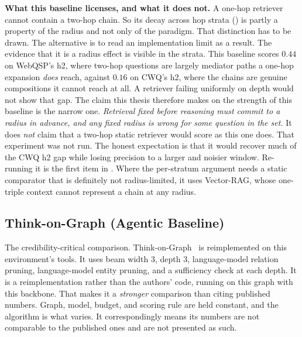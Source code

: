\textbf{What this baseline licenses, and what it does not.} A one-hop retriever
cannot contain a two-hop chain. So its decay across hop strata
() is partly a property of the radius and not only of the
paradigm. That distinction has to be drawn. The alternative is to read an
implementation limit as a result. The evidence that it is a radius effect is
visible in the strata. This baseline scores $0.44$ on WebQSP's \textsf{h2},
where two-hop questions are largely mediator paths a one-hop expansion
\emph{does} reach, against $0.16$ on CWQ's \textsf{h2}, where the chains are
genuine compositions it cannot reach at all. A retriever failing uniformly on
depth would not show that gap. The claim this thesis therefore makes on the
strength of this baseline is the narrow one. \emph{Retrieval fixed before
reasoning must commit to a radius in advance, and any fixed radius is wrong for
some question in the set.} It does \emph{not} claim that a two-hop static
retriever would score as this one does. That experiment was not run. The honest
expectation is that it would recover much of the CWQ \textsf{h2} gap while
losing precision to a larger and noisier window. Re-running it is the first item
in . Where the per-stratum argument needs a static
comparator that is definitely not radius-limited, it uses Vector-RAG, whose
one-triple context cannot represent a chain at any radius.

\subsection{Think-on-Graph (Agentic Baseline)}\label{sec:baseline-tog}

The credibility-critical comparison. Think-on-Graph~\cite{sun2024think}
is reimplemented on this environment's tools. It uses beam
width $3$, depth $3$, language-model relation pruning, language-model entity
pruning, and a sufficiency check at each depth. It is a reimplementation rather
than the authors' code, running on this graph with this backbone. That makes it
a \emph{stronger} comparison than citing published numbers. Graph, model,
budget, and scoring rule are held constant, and the algorithm is what varies. It
correspondingly means its numbers are not comparable to the published ones and
are not presented as such.

